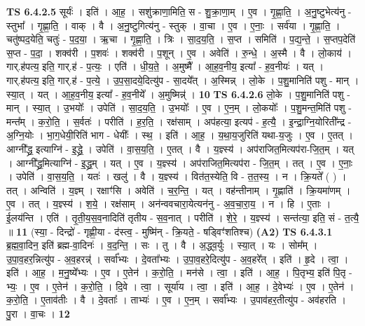 \documentclass[17pt]{extarticle}
\begin{document}
                                \textbf{ TS 6.4.2.5} \newline
                  सूर्यः॑ । इति॑ । आ॒ह॒ । सशु॑क्राणा॒मिति॒ स - शु॒क्रा॒णा॒म् । ए॒व । गृ॒ह्णा॒ति॒ । अ॒नु॒ष्टुभेत्य॑नु - स्तुभा᳚ । गृ॒ह्णा॒ति॒ । वाक् । वै । अ॒नु॒ष्टुगित्य॑नु - स्तुक् । वा॒चा । ए॒व । ए॒नाः॒ । सर्व॑या । गृ॒ह्णा॒ति॒ । चतु॑ष्पद॒येति॒ चतुः॑ - प॒द॒या॒ । ऋ॒चा । गृ॒ह्णा॒ति॒ । त्रिः । सा॒द॒य॒ति॒ । स॒प्त । समिति॑ । प॒द्य॒न्ते॒ । स॒प्तप॒देति॑ स॒प्त - प॒दा॒ । शक्व॑री । प॒शवः॑ । शक्व॑री । प॒शून् । ए॒व । अवेति॑ । रु॒न्धे॒ । अ॒स्मै । वै । लो॒काय॑ । गार्.ह॑पत्य॒ इति॒ गार्.ह॑ - प॒त्यः॒ । एति॑ । धी॒य॒ते॒ । अ॒मुष्मै᳚ । आ॒ह॒व॒नीय॒ इत्या᳚ - ह॒व॒नीयः॑ । यत् । गार्.ह॑पत्य॒ इति॒ गार्.ह॑ - प॒त्ये॒ । उ॒प॒सा॒दये॒दित्यु॑प - सा॒दये᳚त् । अ॒स्मिन्न् । लो॒के । प॒शु॒मानिति॑ पशु - मान् । स्या॒त् । यत् । आ॒ह॒व॒नीय॒ इत्या᳚ - ह॒व॒नीये᳚ । अ॒मुष्मिन्न्॑ । \textbf{  10} \newline
                  \newline
                                \textbf{ TS 6.4.2.6} \newline
                  लो॒के । प॒शु॒मानिति॑ पशु - मान् । स्या॒त् । उ॒भयोः᳚ । उपेति॑ । सा॒द॒य॒ति॒ । उ॒भयोः᳚ । ए॒व । ए॒न॒म् । लो॒कयोः᳚ । प॒शु॒मन्त॒मिति॑ पशु - मन्त᳚म् । क॒रो॒ति॒ । स॒र्वतः॑ । परीति॑ । ह॒र॒ति॒ । रक्ष॑साम् । अप॑हत्या॒ इत्यप॑ - ह॒त्यै॒ । इ॒न्द्रा॒ग्नि॒योरिती᳚न्द्र - अ॒ग्नि॒योः । भा॒ग॒धेयी॒रिति॑ भाग - धेयीः᳚ । स्थ॒ । इति॑ । आ॒ह॒ । य॒था॒य॒जुरिति॑ यथा-य॒जुः । ए॒व । ए॒तत् । आग्नी᳚द्ध्र॒ इत्याग्नि॑ - इ॒द्ध्रे॒ । उपेति॑ । वा॒स॒य॒ति॒ । ए॒तत् । वै । य॒ज्ञ्स्य॑ । अप॑राजित॒मित्यप॑रा-जि॒त॒म् । यत् । आग्नी᳚द्ध्र॒मित्याग्नि॑ - इ॒द्ध्र॒म् । यत् । ए॒व । य॒ज्ञ्स्य॑ । अप॑राजित॒मित्यप॑रा - जि॒त॒म् । तत् । ए॒व । ए॒नाः॒ । उपेति॑ । वा॒स॒य॒ति॒ । यतः॑ । खलु॑ । वै । य॒ज्ञ्स्य॑ । वित॑त॒स्येति॒ वि - त॒त॒स्य॒ । न । क्रि॒यते᳚ ( ) । तत् । अन्विति॑ । य॒ज्ञ्म् । रक्षाꣳ॑सि । अवेति॑ । च॒र॒न्ति॒ । यत् । वह॑न्तीनाम् । गृ॒ह्णाति॑ । क्रि॒यमा॑णम् । ए॒व । तत् । य॒ज्ञ्स्य॑ । श॒ये॒ । रक्ष॑साम् । अन॑न्ववचारा॒येत्यन॑नु - अ॒व॒चा॒रा॒य॒ । न । हि । ए॒ताः । ई॒लय॑न्ति । एति॑ । तृ॒ती॒य॒स॒व॒नादिति॑ तृतीय - स॒व॒नात् । परीति॑ । शे॒रे॒ । य॒ज्ञ्स्य॑ । सन्त॑त्या॒ इति॒ सं - त॒त्यै॒ ॥ \textbf{  11} \newline
                  \newline
                      (स्या॒ - दिन्द्रो॑ - गृह्णी॒या - द॑स्त्व॒ - मुष्मि॑न् - क्रि॒यते॒ - षड्विꣳ॑शतिश्च)  \textbf{(A2)} \newline \newline
                                \textbf{ TS 6.4.3.1} \newline
                  ब्र॒ह्म॒वा॒दिन॒ इति॑ ब्रह्म-वा॒दिनः॑ । व॒द॒न्ति॒ । सः । तु । वै । अ॒द्ध्व॒र्युः । स्या॒त् । यः । सोम᳚म् । उ॒पा॒व॒हर॒न्नित्यु॑प - अ॒व॒हरन्न्॑ । सर्वा᳚भ्यः । दे॒वता᳚भ्यः । उ॒पा॒व॒हरे॒दित्यु॑प - अ॒व॒हरे᳚त् । इति॑ । हृ॒दे । त्वा॒ । इति॑ । आ॒ह॒ । म॒नु॒ष्ये᳚भ्यः । ए॒व । ए॒तेन॑ । क॒रो॒ति॒ । मन॑से । त्वा॒ । इति॑ । आ॒ह॒ । पि॒तृभ्य॒ इति॑ पि॒तृ - भ्यः॒ । ए॒व । ए॒तेन॑ । क॒रो॒ति॒ । दि॒वे । त्वा॒ । सूर्या॑य । त्वा॒ । इति॑ । आ॒ह॒ । दे॒वेभ्यः॑ । ए॒व । ए॒तेन॑ । क॒रो॒ति॒ । ए॒ताव॑तीः । वै । दे॒वताः᳚ । ताभ्यः॑ । ए॒व । ए॒न॒म् । सर्वा᳚भ्यः । उ॒पाव॑हर॒तीत्यु॑प - अव॑हरति । पु॒रा । वा॒चः । \textbf{  12} \newline
\end{document}
